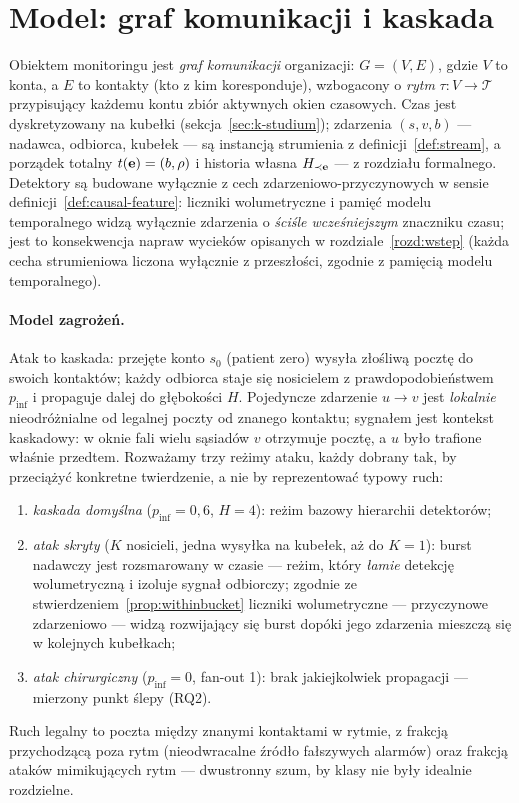 \section{Model: graf komunikacji i kaskada}
\label{sec:k-model}

Obiektem monitoringu jest \emph{graf komunikacji} organizacji:
$G=(V,E)$, gdzie $V$ to konta, a $E$ to kontakty (kto z kim
koresponduje), wzbogacony o \emph{rytm} $\tau\colon V\to\mathcal{T}$
przypisujący każdemu kontu zbiór aktywnych okien czasowych. Czas jest
dyskretyzowany na kubełki (sekcja~\ref{sec:k-studium}); zdarzenia
$(s,v,b)$ --- nadawca, odbiorca, kubełek --- są instancją strumienia
z definicji~\ref{def:stream}, a porządek totalny $t(\mathbf{e})=(b,\rho)$
i historia własna $H_{\prec\mathbf{e}}$ --- z rozdziału
formalnego. Detektory są budowane wyłącznie z cech
zdarzeniowo-przyczynowych w sensie definicji~\ref{def:causal-feature}:
liczniki wolumetryczne i pamięć modelu temporalnego widzą wyłącznie
zdarzenia o \emph{ściśle wcześniejszym} znaczniku czasu; jest to
konsekwencja napraw wycieków opisanych w rozdziale~\ref{rozd:wstep}
(każda cecha strumieniowa liczona wyłącznie z przeszłości, zgodnie
z pamięcią modelu temporalnego).

\paragraph{Model zagrożeń.} Atak to kaskada: przejęte konto
$s_0$ (patient zero) wysyła złośliwą pocztę do swoich kontaktów;
każdy odbiorca staje się nosicielem z prawdopodobieństwem
$p_{\mathrm{inf}}$ i propaguje dalej do głębokości $H$. Pojedyncze
zdarzenie $u\!\to\!v$ jest \emph{lokalnie} nieodróżnialne od legalnej
poczty od znanego kontaktu; sygnałem jest kontekst kaskadowy: w oknie
fali wielu sąsiadów $v$ otrzymuje pocztę, a $u$ było trafione
właśnie przedtem. Rozważamy trzy reżimy ataku, każdy dobrany tak, by
przeciążyć konkretne twierdzenie, a nie by reprezentować typowy
ruch:
\begin{enumerate}
\item \emph{kaskada domyślna} ($p_{\mathrm{inf}}=0{,}6$, $H=4$):
reżim bazowy hierarchii detektorów;
\item \emph{atak skryty} ($K$ nosicieli, jedna wysyłka na kubełek,
aż do $K{=}1$): burst nadawczy jest rozsmarowany w czasie --- reżim,
który \emph{łamie} detekcję wolumetryczną i izoluje sygnał
odbiorczy; zgodnie ze stwierdzeniem~\ref{prop:withinbucket} liczniki
wolumetryczne --- przyczynowe zdarzeniowo --- widzą rozwijający się
burst dopóki jego zdarzenia mieszczą się w kolejnych kubełkach;
\item \emph{atak chirurgiczny} ($p_{\mathrm{inf}}=0$, fan-out 1):
brak jakiejkolwiek propagacji --- mierzony punkt ślepy (RQ2).
\end{enumerate}
Ruch legalny to poczta między znanymi kontaktami w rytmie, z frakcją
przychodzącą poza rytm (nieodwracalne źródło fałszywych alarmów)
oraz frakcją ataków mimikujących rytm --- dwustronny szum, by klasy
nie były idealnie rozdzielne.

